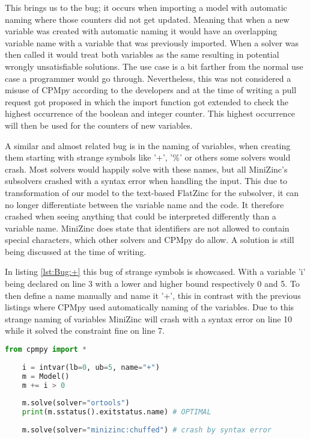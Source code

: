 This brings us to the bug; it occurs when importing a model with automatic naming where those counters did not get updated. Meaning that when a new variable was created with automatic naming it would have an overlapping variable name with a variable that was previously imported. When a solver was then called it would treat both variables as the same resulting in potential wrongly unsatisfiable solutions. The use case is a bit farther from the normal use case a programmer would go through. Nevertheless, this was not considered a misuse of CPMpy according to the developers and at the time of writing a pull request got proposed in which the import function got extended to check the highest occurrence of the boolean and integer counter. This highest occurrence will then be used for the counters of new variables.

A similar and almost related bug is in the naming of variables, when creating them starting with strange symbols like '+', '\%' or others some solvers would crash. Most solvers would happily solve with these names, but all MiniZinc's subsolvers crashed with a syntax error when handling the input. This due to transformation of our model to the text-based FlatZinc for the subsolver, it can no longer differentiate between the variable name and the code. It therefore crashed when seeing anything that could be interpreted differently than a variable name. MiniZinc does state that identifiers are not allowed to contain special characters, which other solvers and CPMpy do allow. A solution is still being discussed at the time of writing.


In listing \ref{lst:Bug:+} this bug of strange symbols is showcased. With a variable 'i' being declared on line 3 with a lower and higher bound respectively 0 and 5. To then define a name manually and name it '+', this in contrast with the previous listings where CPMpy used automatically naming of the variables.  Due to this strange naming of variables MiniZinc will crash with a syntax error on line 10 while it solved the constraint fine on line 7.

\label{lst:Bug:+}
\begin{lstlisting}[language=python, caption={A bug showcasing that the naming of CPMpy's varialbes is less strict than MiniZinc's.}]
	from cpmpy import *
	
	i = intvar(lb=0, ub=5, name="+")
	m = Model()
	m += i > 0
	
	m.solve(solver="ortools")
	print(m.sstatus().exitstatus.name) # OPTIMAL
	
	m.solve(solver="minizinc:chuffed") # crash by syntax error
\end{lstlisting}

